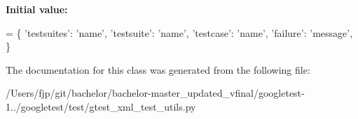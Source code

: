 {\bfseries Initial value\+:}
\begin{DoxyCode}
=  \{
    \textcolor{stringliteral}{'testsuites'}: \textcolor{stringliteral}{'name'},
    \textcolor{stringliteral}{'testsuite'}: \textcolor{stringliteral}{'name'},
    \textcolor{stringliteral}{'testcase'}:  \textcolor{stringliteral}{'name'},
    \textcolor{stringliteral}{'failure'}:   \textcolor{stringliteral}{'message'},
    \}
\end{DoxyCode}


The documentation for this class was generated from the following file\+:\begin{DoxyCompactItemize}
\item 
/\+Users/fjp/git/bachelor/bachelor-\/master\+\_\+updated\+\_\+vfinal/googletest-\/1../googletest/test/gtest\+\_\+xml\+\_\+test\+\_\+utils.\+py\end{DoxyCompactItemize}
